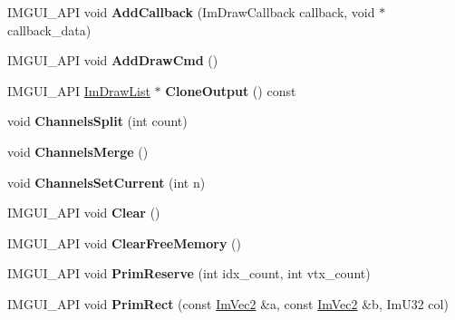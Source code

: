 \begin{DoxyCompactItemize}
\item 
\mbox{\label{structImDrawList_a14073d60ef9db9dc663dc7717a4893a5}} 
I\+M\+G\+U\+I\+\_\+\+A\+PI void {\bfseries Add\+Callback} (Im\+Draw\+Callback callback, void $\ast$callback\+\_\+data)
\item 
\mbox{\label{structImDrawList_a846714bb0321c6f1f908767abc8559e6}} 
I\+M\+G\+U\+I\+\_\+\+A\+PI void {\bfseries Add\+Draw\+Cmd} ()
\item 
\mbox{\label{structImDrawList_a24c853c3976c77e7b361fab39adde686}} 
I\+M\+G\+U\+I\+\_\+\+A\+PI \hyperlink{structImDrawList}{Im\+Draw\+List} $\ast$ {\bfseries Clone\+Output} () const
\item 
\mbox{\label{structImDrawList_acd7bcb6c4c5043876cfc169a98abc24a}} 
void {\bfseries Channels\+Split} (int count)
\item 
\mbox{\label{structImDrawList_a2ed82c3f663cda520c90c55b94196274}} 
void {\bfseries Channels\+Merge} ()
\item 
\mbox{\label{structImDrawList_aba9e93d0bf1c3884beb726e96360d2e2}} 
void {\bfseries Channels\+Set\+Current} (int n)
\item 
\mbox{\label{structImDrawList_ac422590c71dc5593aea52f65793aee81}} 
I\+M\+G\+U\+I\+\_\+\+A\+PI void {\bfseries Clear} ()
\item 
\mbox{\label{structImDrawList_a8b2686e006f57c554b709dfc47e2ad63}} 
I\+M\+G\+U\+I\+\_\+\+A\+PI void {\bfseries Clear\+Free\+Memory} ()
\item 
\mbox{\label{structImDrawList_a879aa38dbfb0344e3e023d65c002c7d7}} 
I\+M\+G\+U\+I\+\_\+\+A\+PI void {\bfseries Prim\+Reserve} (int idx\+\_\+count, int vtx\+\_\+count)
\item 
\mbox{\label{structImDrawList_ae2be093563f1d20b8190b7c423113925}} 
I\+M\+G\+U\+I\+\_\+\+A\+PI void {\bfseries Prim\+Rect} (const \hyperlink{structImVec2}{Im\+Vec2} \&a, const \hyperlink{structImVec2}{Im\+Vec2} \&b, Im\+U32 col)
\item 

\end{DoxyCompactItemize}
